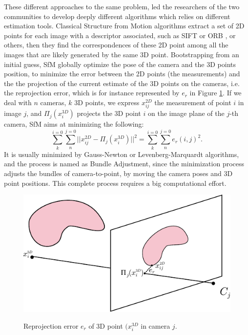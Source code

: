 These different approaches to the same problem, led the researchers of the two communities to develop deeply different algorithms which relies on different estimation tools.
Classical Structure from Motion algorithms \cite{triggs2000bundle,sibley2009adaptive,wu2011multicore} extract a set of 2D points for each image with a descriptor associated, such as SIFT \cite{sift} or ORB \cite{orb}, or others, then they find the correspondences of these 2D point among all the images that are likely generated by the same 3D point. Bootstrapping from an initial guess, SfM globally optimize the pose of the camera and the 3D points position, to minimize the error between the 2D points (the measurements) and the the projection of the current estimate of the 3D points on the cameras, i.e. the reprojection error, which is for instance represented by $e_r$ in Figure \ref{fig:reprojectionerror}.
If we deal with $n$ cameras, $k$ 3D points, we express $x_{ij}^{2D}$ the measurement of point $i$ in image $j$, and $\Pi_j(x_i^{3D})$ projects the 3D point $i$ on the image plane of the $j$-th camera, SfM aims at minimizing the following:
\[
\sum_{k}^{i=0}\sum_{n}^{j=0}||x_{ij}^{2D} - \Pi_j(x_i^{3D})||^2 = \sum_{k}^{i=0}\sum_{n}^{j=0}e_r(i,j) ^2.
\]
It is usually minimized by Gauss-Newton or Levenberg-Marquardt algorithms, and the process is named as Bundle Adjustment, since the minimization process adjusts the bundles of camera-to-point, by moving the camera poses and 3D point positions. This complete process requires a big computational effort.

\begin{figure}[t]
\includegraphics[width=0.99\columnwidth]{./img/ch_soa/reproj}
\label{fig:reprojectionerror}
 \caption{Reprojection error $e_r$ of 3D point $(x_i^{3D}$ in camera $j$.} 
\end{figure}



